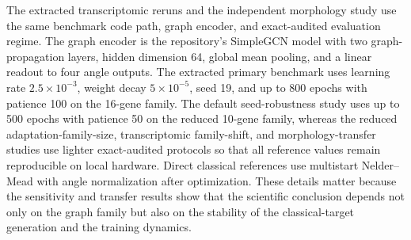 \documentclass[
  reprint,
  twocolumn,
  aps,
  superscriptaddress,
  longbibliography,
  floatfix
]{revtex4-2}
\begin{document}
The extracted transcriptomic reruns and the independent morphology study use the same benchmark code path, graph encoder, and exact-audited evaluation regime. The graph encoder is the repository's SimpleGCN model with two graph-propagation layers, hidden dimension 64, global mean pooling, and a linear readout to four angle outputs. The extracted primary benchmark uses learning rate $2.5\times 10^{-3}$, weight decay $5\times 10^{-5}$, seed 19, and up to 800 epochs with patience 100 on the 16-gene family. The default seed-robustness study uses up to 500 epochs with patience 50 on the reduced 10-gene family, whereas the reduced adaptation-family-size, transcriptomic family-shift, and morphology-transfer studies use lighter exact-audited protocols so that all reference values remain reproducible on local hardware. Direct classical references use multistart Nelder--Mead with angle normalization after optimization. These details matter because the sensitivity and transfer results show that the scientific conclusion depends not only on the graph family but also on the stability of the classical-target generation and the training dynamics.
\end{document}
